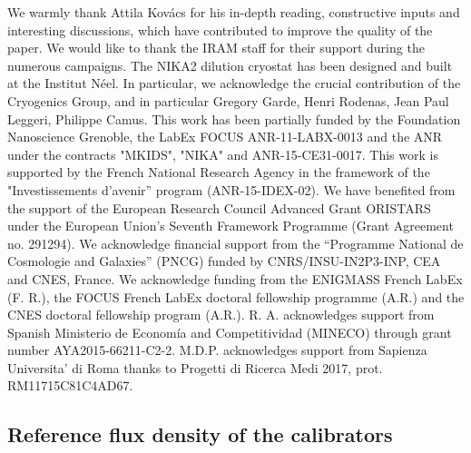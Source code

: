 \documentclass[traditionalabstract]{aa}
\newcommand{\rev}[1]{#1}
\begin{document}
{\begin{acknowledgements}
  {\rev We warmly thank Attila Kov\'acs for his in-depth reading,
    constructive inputs and interesting discussions, which have
    contributed to improve the quality of the paper.}
  We would like to thank the IRAM staff for their support during the
  numerous campaigns. 
  The NIKA2 dilution cryostat has been designed and built at the Institut N\'eel. 
  In particular, we acknowledge the crucial contribution of the Cryogenics Group, and 
  in particular Gregory Garde, Henri Rodenas, Jean Paul Leggeri, Philippe Camus. 
  This work has been partially funded by the Foundation Nanoscience
  Grenoble, the LabEx FOCUS ANR-11-LABX-0013 and the ANR under the
  contracts "MKIDS", "NIKA" and ANR-15-CE31-0017. This work is
  supported by the French National Research Agency in the framework of
  the "Investissements d’avenir” program (ANR-15-IDEX-02).
  We have benefited from the support of the European Research Council Advanced
  Grant ORISTARS under the European Union's Seventh Framework
  Programme (Grant Agreement no. 291294). We acknowledge financial
  support from the “Programme National de Cosmologie and Galaxies”
  (PNCG) funded by CNRS/INSU-IN2P3-INP, CEA and CNES, France.
  We acknowledge funding from the ENIGMASS French LabEx (F. R.), the FOCUS French
  LabEx doctoral fellowship programme (A.R.) and the CNES doctoral
  fellowship program (A.R.). R. A. acknowledges support from
  Spanish Ministerio de Econom\'ia and Competitividad (MINECO) through
  grant number AYA2015-66211-C2-2. M.D.P. acknowledges support from
  Sapienza Universita' di Roma thanks to Progetti di Ricerca Medi 2017,
  prot. RM11715C81C4AD67. 
\end{acknowledgements}

%
%

\begin{appendix}
  \section{Reference flux density of the calibrators}
  \label{ap:ref_flux_calibrator}


\end{appendix}}
\end{document}
